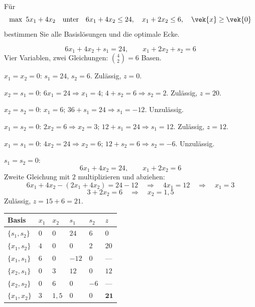 \begin{aufgabe}
Für
\[ \max\ 5x_1+4x_2 \quad\text{unter}\quad 6x_1+4x_2 \le 24,\quad x_1+2x_2 \le 6,\quad \vek{x}\ge\vek{0} \]
bestimmen Sie alle Basislösungen und die optimale Ecke.

\loesung
{}
\[ 6x_1+4x_2+s_1 = 24, \qquad x_1+2x_2+s_2 = 6 \]
Vier Variablen, zwei Gleichungen: $\binom{4}{2}=6$ Basen.

$x_1=x_2=0$: $s_1=24$, $s_2=6$. Zulässig, $z=0$.

$x_2=s_1=0$: $6x_1=24 \Rightarrow x_1=4$; $4+s_2=6 \Rightarrow s_2=2$. Zulässig, $z=20$.

$x_2=s_2=0$: $x_1=6$; $36+s_1=24 \Rightarrow s_1=-12$. \textcolor{akzent}{Unzulässig.}

$x_1=s_2=0$: $2x_2=6 \Rightarrow x_2=3$; $12+s_1=24 \Rightarrow s_1=12$. Zulässig, $z=12$.

$x_1=s_1=0$: $4x_2=24 \Rightarrow x_2=6$; $12+s_2=6 \Rightarrow s_2=-6$. \textcolor{akzent}{Unzulässig.}

$s_1=s_2=0$:
\[ 6x_1+4x_2 = 24, \qquad x_1+2x_2 = 6 \]
Zweite Gleichung mit $2$ multiplizieren und abziehen:
\[ 6x_1+4x_2 - (2x_1+4x_2) = 24-12 \quad\Longrightarrow\quad 4x_1 = 12 \quad\Longrightarrow\quad x_1 = 3 \]
\[ 3+2x_2 = 6 \quad\Longrightarrow\quad x_2 = 1{,}5 \]
Zulässig, $z = 15+6 = 21$.

\begin{center}
{\small
\renewcommand{\arraystretch}{1.46}
\begin{tabular}{@{}P{1.8cm}P{1.4cm}P{1.4cm}P{1.4cm}P{1.4cm}P{1.4cm}@{}}
\toprule
\textbf{Basis} & $x_1$ & $x_2$ & $s_1$ & $s_2$ & $z$\\
\midrule
$\{s_1,s_2\}$ & $0$ & $0$ & $24$ & $6$ & $0$\\
$\{x_1,s_2\}$ & $4$ & $0$ & $0$ & $2$ & $20$\\
$\{x_1,s_1\}$ & $6$ & $0$ & \textcolor{akzent}{$-12$} & $0$ & ---\\
$\{x_2,s_1\}$ & $0$ & $3$ & $12$ & $0$ & $12$\\
$\{x_2,s_2\}$ & $0$ & $6$ & $0$ & \textcolor{akzent}{$-6$} & ---\\
$\{x_1,x_2\}$ & $3$ & $1{,}5$ & $0$ & $0$ & $\mathbf{21}$\\
\bottomrule
\end{tabular}}
\end{center}


\end{aufgabe}
